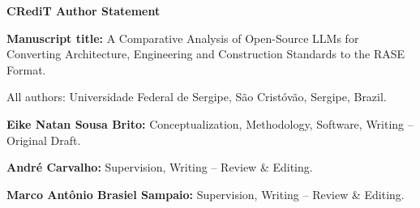 \documentclass[11pt]{article}
\begin{document}
\begin{center}
{\Large \textbf{CRediT Author Statement}}
\end{center}

\bigskip
\noindent \textbf{Manuscript title:} A Comparative Analysis of Open-Source LLMs
for Converting Architecture, Engineering and Construction Standards to the RASE
Format.

\bigskip
\noindent All authors: Universidade Federal de Sergipe, S\~ao Crist\'ov\~ao,
Sergipe, Brazil.

\bigskip
\noindent \textbf{Eike Natan Sousa Brito:} Conceptualization, Methodology,
Software, Writing -- Original Draft.

\noindent \textbf{Andr\'e Carvalho:} Supervision, Writing -- Review \& Editing.

\noindent \textbf{Marco Ant\^onio Brasiel Sampaio:} Supervision, Writing --
Review \& Editing.
\end{document}

